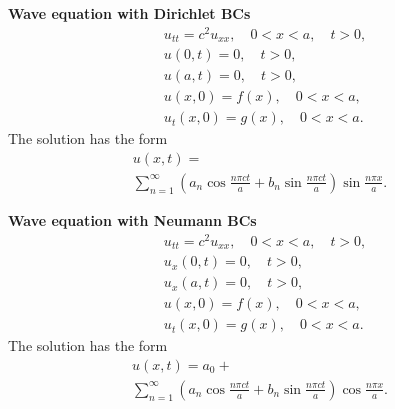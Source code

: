 \begin{minipage}{\linewidth}
    \vspace{20pt}
    \begin{minipage}{0.5\linewidth}
        \textbf{Wave equation with Dirichlet BCs}
        \[
        \begin{aligned}
            & u_{tt} = c^{2}  u_{xx}, \quad 0<x<a , \quad t>0, \\
            & u(0,t)=0, \quad t>0,\\
            & u(a,t)=0, \quad t>0, \\
            & u(x,0)=f(x), \quad 0<x<a, \\
            & u_{t}(x,0)=g(x), \quad 0<x<a.
        \end{aligned}
        \]
        The solution has the form
        \begin{multline*}
            u(x,t)=\\ 
            \sum_{n=1}^{\infty} \left(a_{n}\cos \frac{n\pi c t}{a} + b_{n}\sin \frac{n\pi c t}{a} \right) \sin \frac{n\pi x}{a}.
        \end{multline*}
    \end{minipage}
    \begin{minipage}{0.5\linewidth}
        \textbf{Wave equation with Neumann BCs}
        \[
        \begin{aligned}
            & u_{tt} = c^{2}  u_{xx}, \quad 0<x<a , \quad t>0, \\
            & u_{x}(0,t)=0, \quad t>0,\\
            & u_{x}(a,t)=0, \quad t>0, \\
            & u(x,0)=f(x), \quad 0<x<a, \\
            & u_{t}(x,0)=g(x), \quad 0<x<a.
        \end{aligned}
        \]
        The solution has the form
        \begin{multline*}
            u(x,t)= a_{0} + \\ 
            \sum_{n=1}^{\infty} \left(a_{n}\cos \frac{n\pi c t}{a} + b_{n}\sin \frac{n\pi c t}{a} \right) \cos \frac{n\pi x}{a}.
        \end{multline*}
    \end{minipage}
\end{minipage}

\newpage


